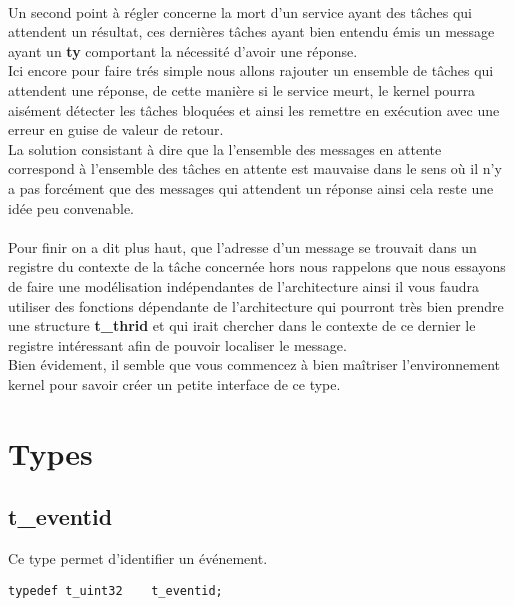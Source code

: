 \documentclass[10pt,a4wide]{article}
\begin{document}
\paragraph{}

Un second point \`a r\'egler concerne la mort d'un service ayant des t\^aches qui attendent un r\'esultat, ces derni\`eres t\^aches ayant bien
entendu \'emis un message ayant un \textbf{ty} comportant la n\'ecessit\'e d'avoir une r\'eponse.\\
Ici encore pour faire tr\'es simple nous allons rajouter un ensemble de t\^aches qui attendent une r\'eponse, de cette mani\`ere si le service
meurt, le kernel pourra ais\'ement d\'etecter les t\^aches bloqu\'ees et ainsi les remettre en ex\'ecution avec une erreur en guise de valeur de retour.\\
La solution consistant \`a dire que la l'ensemble des messages en attente correspond \`a l'ensemble des t\^aches en attente est mauvaise
dans le sens o\`u il n'y a pas forc\'ement que des messages qui attendent un r\'eponse ainsi cela reste une id\'ee peu convenable.\\

\paragraph{}

Pour finir on a dit plus haut, que l'adresse d'un message se trouvait dans un registre du contexte de la t\^ache concern\'ee hors nous
rappelons que nous essayons de faire une mod\'elisation ind\'ependantes de l'architecture ainsi il vous faudra utiliser des fonctions
d\'ependante de l'architecture qui pourront tr\`es bien prendre une structure \textbf{t\_thrid} et qui irait chercher dans le contexte de
ce dernier le registre int\'eressant afin de pouvoir localiser le message.\\
Bien \'evidement, il semble que vous commencez \`a bien ma\^itriser l'environnement kernel pour savoir cr\'eer un petite interface
de ce type.

\section{Types}

\subsection{t\_eventid}
Ce type permet d'identifier un \'ev\'enement.
\begin{verbatim}
typedef t_uint32	t_eventid;
\end{verbatim}
\end{document}
